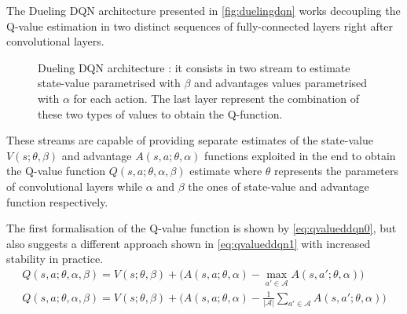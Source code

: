 The Dueling DQN architecture \cite{wang2015dueling} presented in \vref{fig:duelingdqn} works decoupling the Q-value estimation in two distinct sequences of fully-connected layers right after convolutional layers.
\begin{figure}
	\centering
	\caption[Dueling DQN]{ Dueling DQN architecture \cite{wang2015dueling}: it consists in two stream to estimate state-value parametrised with $\beta$ and advantages values parametrised with $\alpha$ for each action.
		The last layer represent the combination of these two types of values to obtain the Q-function.
		\cite{franccois2018introduction}}
	\label{fig:duelingdqn}
\end{figure}

These streams are capable of providing separate estimates of the state-value  $V(s; \theta, \beta)$ and advantage $A(s,a; \theta, \alpha)$ functions exploited in the end to obtain the Q-value function $Q(s,a; \theta, \alpha, \beta)$ estimate where $\theta$ represents the parameters of convolutional layers while $\alpha$ and $\beta$ the ones of state-value and advantage function respectively.

The first formalisation of the Q-value function is shown by \vref{eq:qvalueddqn0}, but \cite{wang2015dueling} also suggests a different approach shown in \vref{eq:qvalueddqn1} with increased stability in practice.
\begin{gather}
	Q(s,a; \theta, \alpha, \beta) = V(s;\theta, \beta) + \big(A(s,a;\theta, \alpha) - \max_{a' \in \mathcal{A}}A(s, a'; \theta, \alpha)\big) \label{eq:qvalueddqn0}\\
	Q(s,a; \theta, \alpha, \beta) = V(s;\theta, \beta) + \big(A(s,a;\theta, \alpha) - \frac{1}{|\mathcal{A}|}\sum_{a' \in \mathcal{A}}A(s, a'; \theta, \alpha)\big) \label{eq:qvalueddqn1}
\end{gather}


